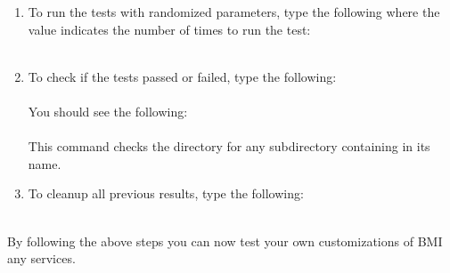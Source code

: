 \begin{enumerate}
\item To run the tests with randomized parameters, type the following where the value indicates the number of times to run the test: \\

 \\

\item To check if the tests passed or failed, type the following: \\

 \\

  You should see the following: \\
 
 \\

  This command checks the  directory for any subdirectory containing  in its name. \\
 
\item To cleanup all previous results, type the following: \\

 \\

\end{enumerate}

By following the above steps you can now test your own customizations of BMI any services.

